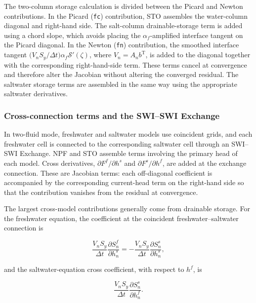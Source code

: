The two-column storage calculation is divided between the \mf Picard and Newton contributions. In the Picard (\texttt{fc}) contribution, STO assembles the water-column diagonal and right-hand side. The salt-column drainable-storage term is added using a chord slope, which avoids placing the $\alpha_{f}$-amplified interface tangent on the Picard diagonal. In the Newton (\texttt{fn}) contribution, the smoothed interface tangent $\big(V_{n}S_{y}/\Delta t\big)\alpha_{f}\mathcal{S}'(\zeta)$, where $V_{n}=A_{n}b^{\mathrm{T}}$, is added to the diagonal together with the corresponding right-hand-side term. These terms cancel at convergence and therefore alter the Jacobian without altering the converged residual. The saltwater storage terms are assembled in the same way using the appropriate saltwater derivatives.

\subsubsection{Cross-connection terms and the SWI--SWI Exchange}
\label{sec:swi-cross}

In two-fluid mode, freshwater and saltwater models use coincident grids, and each freshwater cell is connected to the corresponding saltwater cell through an SWI--SWI Exchange. NPF and STO assemble terms involving the primary head of each model. Cross derivatives, $\partial F^{f}/\partial h^{s}$ and $\partial F^{s}/\partial h^{f}$, are added at the exchange connection. These are Jacobian terms: each off-diagonal coefficient is accompanied by the corresponding current-head term on the right-hand side so that the contribution vanishes from the residual at convergence.

The largest cross-model contributions generally come from drainable storage. For the freshwater equation, the coefficient at the coincident freshwater--saltwater connection is

\begin{equation}
\label{eqn:swi-crossf}
\frac{V_{n}S_{y}}{\Delta t}\frac{\partial S_{n}^{f}}{\partial h_{n}^{s}}
=-\frac{V_{n}S_{y}}{\Delta t}\frac{\partial S_{n}^{s}}{\partial h_{n}^{s}},
\end{equation}

\noindent and the saltwater-equation cross coefficient, with respect to $h^{f}$, is

\begin{equation}
\label{eqn:swi-crosss}
\frac{V_{n}S_{y}}{\Delta t}\frac{\partial S_{n}^{s}}{\partial h_{n}^{f}}.
\end{equation}

